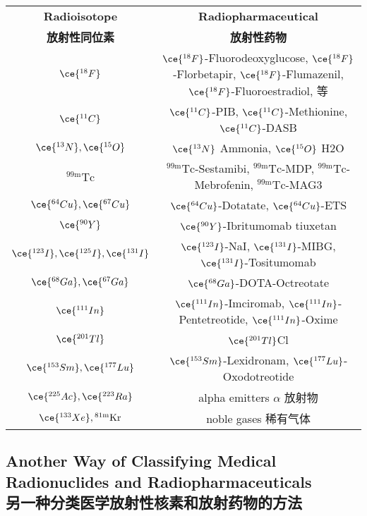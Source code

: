 \documentclass[dvipsnames, svgnames,a4paper,11pt]{article}
\begin{document}
\begin{table}[h]
      \centering
       \label{tabel2}
      \begin{tabular}{cc}
      \toprule
      \textbf{Radioisotope} & \textbf{Radiopharmaceutical} \\
      \textbf{放射性同位素} & \textbf{放射性药物} \\
      \midrule
      \(\ce{^{18}F}\) & \(\ce{^{18}F}\)-Fluorodeoxyglucose, \(\ce{^{18}F}\)-Florbetapir, \(\ce{^{18}F}\)-Flumazenil, \(\ce{^{18}F}\)-Fluoroestradiol, 等 \\
      \(\ce{^{11}C}\) & \(\ce{^{11}C}\)-PIB, \(\ce{^{11}C}\)-Methionine, \(\ce{^{11}C}\)-DASB \\
      \(\ce{^{13}N}, \ce{^{15}O}\) & \(\ce{^{13}N}\) Ammonia, \(\ce{^{15}O}\) H2O \\
      \(\mathrm{^{99m}Tc}\) & \(\mathrm{^{99m}Tc}\)-Sestamibi, \(\mathrm{^{99m}Tc}\)-MDP, \(\mathrm{^{99m}Tc}\)-Mebrofenin, \(\mathrm{^{99m}Tc}\)-MAG3 \\
      \(\ce{^{64}Cu}, \ce{^{67}Cu}\) & \(\ce{^{64}Cu}\)-Dotatate, \(\ce{^{64}Cu}\)-ETS \\
      \(\ce{^{90}Y}\) & \(\ce{^{90}Y}\)-Ibritumomab tiuxetan \\
      \(\ce{^{123}I}, \ce{^{125}I}, \ce{^{131}I}\) & \(\ce{^{123}I}\)-NaI, \(\ce{^{131}I}\)-MIBG, \(\ce{^{131}I}\)-Tositumomab \\
      \(\ce{^{68}Ga}, \ce{^{67}Ga}\) & \(\ce{^{68}Ga}\)-DOTA-Octreotate \\
      \(\ce{^{111}In}\) & \(\ce{^{111}In}\)-Imciromab, \(\ce{^{111}In}\)-Pentetreotide, \(\ce{^{111}In}\)-Oxime \\
      \(\ce{^{201}Tl}\) & \(\ce{^{201}Tl}\)Cl \\
      \(\ce{^{153}Sm}, \ce{^{177}Lu}\) & \(\ce{^{153}Sm}\)-Lexidronam, \(\ce{^{177}Lu}\)-Oxodotreotide \\
      \(\ce{^{225}Ac}, \ce{^{223}Ra}\) & alpha emitters $\alpha$ 放射物 \\
      \(\ce{^{133}Xe}, \mathrm{^{81m}Kr}\) & noble gases 稀有气体  \\
      \bottomrule
      \end{tabular}
      \end{table}

\subsection{Another Way of Classifying Medical Radionuclides and Radiopharmaceuticals\\另一种分类医学放射性核素和放射药物的方法}
\end{document}
